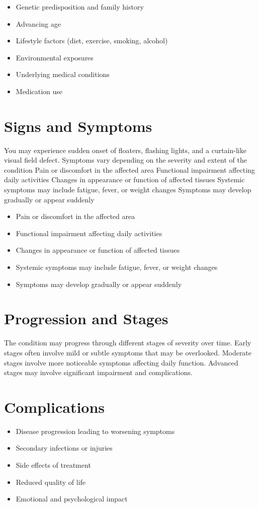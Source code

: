 \begin{itemize}[noitemsep]
  \item Genetic predisposition and family history
  \item Advancing age
  \item Lifestyle factors (diet, exercise, smoking, alcohol)
  \item Environmental exposures
  \item Underlying medical conditions
  \item Medication use
\end{itemize}
\section{Signs and Symptoms}
You may experience sudden onset of floaters, flashing lights, and a curtain-like visual field defect. Symptoms vary depending on the severity and extent of the condition Pain or discomfort in the affected area Functional impairment affecting daily activities Changes in appearance or function of affected tissues Systemic symptoms may include fatigue, fever, or weight changes Symptoms may develop gradually or appear suddenly

\begin{itemize}[noitemsep]
  \item Pain or discomfort in the affected area
  \item Functional impairment affecting daily activities
  \item Changes in appearance or function of affected tissues
  \item Systemic symptoms may include fatigue, fever, or weight changes
  \item Symptoms may develop gradually or appear suddenly
\end{itemize}
\section{Progression and Stages}
The condition may progress through different stages of severity over time. Early stages often involve mild or subtle symptoms that may be overlooked. Moderate stages involve more noticeable symptoms affecting daily function. Advanced stages may involve significant impairment and complications.
\section{Complications}
\begin{itemize}[noitemsep]
  \item Disease progression leading to worsening symptoms
  \item Secondary infections or injuries
  \item Side effects of treatment
  \item Reduced quality of life
  \item Emotional and psychological impact
\end{itemize}
